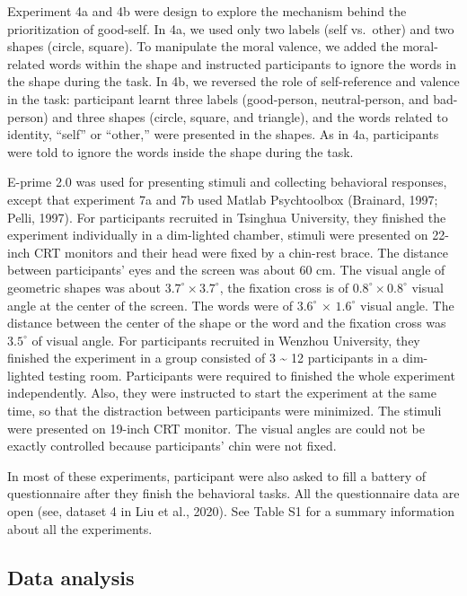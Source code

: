 \documentclass[
  english,
  man]{apa6}
\begin{document}
Experiment 4a and 4b were design to explore the mechanism behind the prioritization of good-self. In 4a, we used only two labels (self vs.~other) and two shapes (circle, square). To manipulate the moral valence, we added the moral-related words within the shape and instructed participants to ignore the words in the shape during the task. In 4b, we reversed the role of self-reference and valence in the task: participant learnt three labels (good-person, neutral-person, and bad-person) and three shapes (circle, square, and triangle), and the words related to identity, ``self'' or ``other,'' were presented in the shapes. As in 4a, participants were told to ignore the words inside the shape during the task.

E-prime 2.0 was used for presenting stimuli and collecting behavioral responses, except that experiment 7a and 7b used Matlab Psychtoolbox (Brainard, 1997; Pelli, 1997). For participants recruited in Tsinghua University, they finished the experiment individually in a dim-lighted chamber, stimuli were presented on 22-inch CRT monitors and their head were fixed by a chin-rest brace. The distance between participants' eyes and the screen was about 60 cm. The visual angle of geometric shapes was about \(3.7^\circ × 3.7^\circ\), the fixation cross is of \(0.8^\circ × 0.8^\circ\) visual angle at the center of the screen. The words were of \(3.6^\circ\) × \(1.6^\circ\) visual angle. The distance between the center of the shape or the word and the fixation cross was \(3.5^\circ\) of visual angle. For participants recruited in Wenzhou University, they finished the experiment in a group consisted of 3 \textasciitilde{} 12 participants in a dim-lighted testing room. Participants were required to finished the whole experiment independently. Also, they were instructed to start the experiment at the same time, so that the distraction between participants were minimized. The stimuli were presented on 19-inch CRT monitor. The visual angles are could not be exactly controlled because participants' chin were not fixed.

In most of these experiments, participant were also asked to fill a battery of questionnaire after they finish the behavioral tasks. All the questionnaire data are open (see, dataset 4 in Liu et al., 2020). See Table S1 for a summary information about all the experiments.

\hypertarget{data-analysis}{%
\subsection{Data analysis}\label{data-analysis}}
\end{document}
